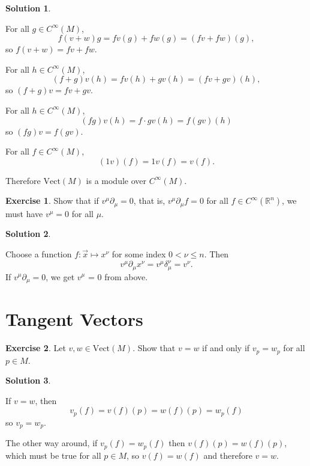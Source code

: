 \documentclass[11pt, a4paper]{report}
\theoremstyle{definition}
\newtheorem{ex}{Exercise}[part]
\newtheorem{sol}{Solution}[part]
\begin{document}
\begin{sol}\label{sol:module}

For all $g \in C^\infty(M)$,
\[
    f(v + w)g = fv(g) + fw(g) = (fv + fw)(g),
\]
so $f(v + w) = fv + fw$.

For all $h \in C^\infty(M)$,
\[
    (f + g)v(h) = fv(h) + gv(h) = (fv + gv)(h),
\]
so $(f + g)v = fv + gv$.


For all $h \in C^\infty(M)$,
\[
    (fg)v(h) = f \cdot gv(h) = f(gv)(h)
\]
so $(fg)v = f(gv)$.

For all $f \in C^\infty(M)$,
\[
    (1v)(f) = 1v(f) = v(f).
\]

Therefore $\text{Vect}(M)$ is a module over $C^\infty(M)$.

\end{sol}

\begin{ex}

Show that if $v^\mu\partial_\mu = 0$, that is, $v^\mu \partial_\mu f = 0$ for all $f \in C^\infty(\mathbb{R}^n)$, we must have $v^\mu = 0$ for all $\mu$.

\end{ex}

\begin{sol}\label{sol:basis}

Choose a function $f: \vec{x} \mapsto x^\nu$ for some index $0 < \nu \leq n$. Then
\[
    v^\mu \partial_\mu x^\nu = v^\mu \delta_\mu^\nu = v^\nu.
\]
If $v^\mu\partial_\mu = 0$, we get $v^\mu$ = 0 from above.

\end{sol}

\section{Tangent Vectors}

\begin{ex}

Let $v, w \in \text{Vect}(M)$. Show that $v = w$ if and only if $v_p = w_p$ for all $p \in M$.

\end{ex}

\begin{sol}\label{sol:tangentvectorpointequality}

If $v = w$, then
\[
    v_p(f) = v(f)(p) = w(f)(p) = w_p(f)
\]
so $v_p = w_p$.

The other way around, if $v_p(f) = w_p(f)$ then $v(f)(p) = w(f)(p)$, which must be true for all $p \in M$, so $v(f) = w(f)$ and therefore $v = w$.

\end{sol}
\end{document}
